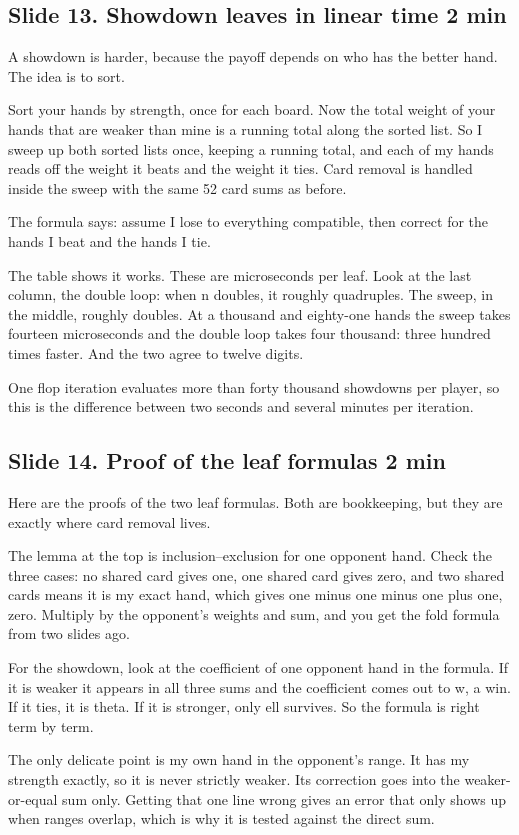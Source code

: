 \documentclass[11pt]{article}
\newcommand{\slidehead}[3]{\subsection*{Slide #1. #2 \hfill {\normalfont\small #3}}}
\begin{document}
\slidehead{13}{Showdown leaves in linear time}{2 min}
\begin{say}
A showdown is harder, because the payoff depends on who has the better hand. The idea is to sort.

Sort your hands by strength, once for each board. Now the total weight of your hands that are weaker than mine is a
running total along the sorted list. So I sweep up both sorted lists once, keeping a running total, and each of my
hands reads off the weight it beats and the weight it ties. Card removal is handled inside the sweep with the same
52 card sums as before.

The formula says: assume I lose to everything compatible, then correct for the hands I beat and the hands I tie.

The table shows it works. These are microseconds per leaf. Look at the last column, the double loop: when n
doubles, it roughly quadruples. The sweep, in the middle, roughly doubles. At a thousand and eighty-one hands the
sweep takes fourteen microseconds and the double loop takes four thousand: three hundred times faster. And the two
agree to twelve digits.

One flop iteration evaluates more than forty thousand showdowns per player, so this is the difference between two
seconds and several minutes per iteration.
\end{say}
\slidehead{14}{Proof of the leaf formulas}{2 min}
\begin{say}
Here are the proofs of the two leaf formulas. Both are bookkeeping, but they are exactly where card removal lives.

The lemma at the top is inclusion--exclusion for one opponent hand. Check the three cases: no shared card gives one,
one shared card gives zero, and two shared cards means it is my exact hand, which gives one minus one minus one plus
one, zero. Multiply by the opponent's weights and sum, and you get the fold formula from two slides ago.

For the showdown, look at the coefficient of one opponent hand in the formula. If it is weaker it appears in all
three sums and the coefficient comes out to w, a win. If it ties, it is theta. If it is stronger, only ell survives.
So the formula is right term by term.

The only delicate point is my own hand in the opponent's range. It has my strength exactly, so it is never strictly
weaker. Its correction goes into the weaker-or-equal sum only. Getting that one line wrong gives an error that only
shows up when ranges overlap, which is why it is tested against the direct sum.
\end{say}
\end{document}
